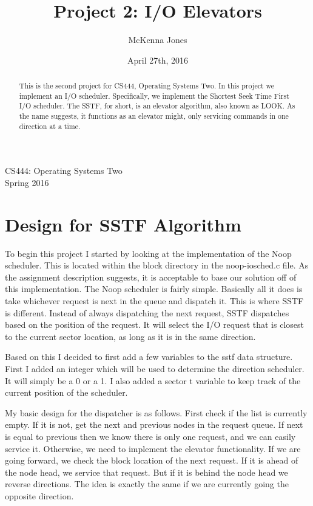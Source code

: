 \documentclass[letterpaper,10pt,titlepage,draftclsnofoot,onecolumn]{IEEEtran}
\title{Project 2: I/O Elevators}
\author{McKenna Jones}
\date{April 27th, 2016}
\begin{document}
\begin{titlepage}

\maketitle
\begin{center}
CS444: Operating Systems Two \\
Spring 2016
\vspace{50 mm}
\end{center}
\begin{abstract}
This is the second project for CS444, Operating Systems Two. In this project we implement an I/O scheduler. Specifically, we implement the Shortest Seek Time First I/O scheduler. The SSTF, for short, is an elevator algorithm, also known as LOOK. As the name suggests, it functions as an elevator might, only servicing commands in one direction at a time. 
\end{abstract}
\end{titlepage}
\section{Design for SSTF Algorithm}
To begin this project I started by looking at the implementation of the Noop scheduler. This is located within the block directory in the noop-iosched.c file. As the assignment description suggests, it is acceptable to base our solution off of this implementation. The Noop scheduler is fairly simple. Basically all it does is take whichever request is next in the queue and dispatch it. This is where SSTF is different. Instead of always dispatching the next request, SSTF dispatches based on the position of the request. It will select the I/O request that is closest to the current sector location, as long as it is in the same direction.

Based on this I decided to first add a few variables to the sstf data structure. First I added an integer which will be used to determine the direction scheduler. It will simply be a 0 or a 1. I also added a sector t variable to keep track of the current position of the scheduler. 

My basic design for the dispatcher is as follows. First check if the list is currently empty. If it is not, get the next and previous nodes in the request queue. If next is equal to previous then we know there is only one request, and we can easily service it. Otherwise, we need to implement the elevator functionality. If we are going forward, we check the block location of the next request. If it is ahead of the node head, we service that request. But if it is behind the node head we reverse directions. The idea is exactly the same if we are currently going the opposite direction.
\end{document}
